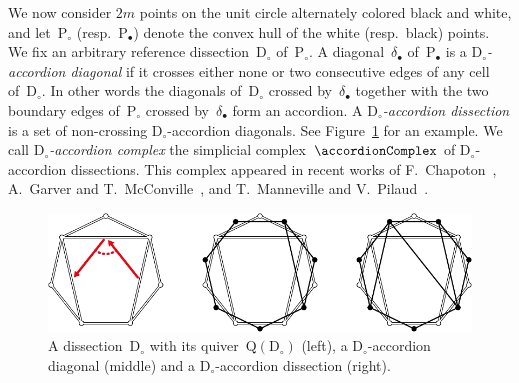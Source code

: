 \documentclass{amsart}
\theoremstyle{definition}
\newcommand{\fref}[1]{Figure~\ref{#1}} %
\newcommand{\darkblue}{\color{darkblue}} %
\newcommand{\defn}[1]{\textsl{\darkblue #1}} %
\newcommand{\polygon}{\mathrm{P}} %
\newcommand{\dissection}{\mathrm{D}} %
\newcommand{\sign}[3]{\varepsilon \big( {#1} \in {#2}\;|\;{#3} \big)} %
\newcommand{\SSS}{\reflectbox{$\mathsf{Z}$}} %
\newcommand{\ZZZ}{\mathsf{Z}} %
\newcommand{\VVV}{{\mathsf{{V \hspace{-.1686cm} I\,}}}} %
\newcommand{\quiver}{\mathrm{Q}} %
\begin{document}
We now consider $2m$ points on the unit circle alternately colored black and white, and let~$\polygon_\circ$ (resp.~$\polygon_\bullet$) denote the convex hull of the white (resp.~black) points.
We fix an arbitrary reference dissection~$\dissection_\circ$ of~$\polygon_\circ$.
A diagonal~$\delta_\bullet$ of~$\polygon_\bullet$ is a \defn{$\dissection_\circ$-accordion diagonal} if it crosses either none or two consecutive edges of any cell of~$\dissection_\circ$.
In other words the diagonals of~$\dissection_\circ$ crossed by~$\delta_\bullet$ together with the two boundary edges of~$\polygon_\circ$ crossed by~$\delta_\bullet$ form an accordion.
A \defn{$\dissection_\circ$-accordion dissection} is a set of non-crossing \mbox{$\dissection_\circ$-accordion} diagonals. 
See \fref{fig:exmAccordionDissections} for an example.
We call \defn{$\dissection_\circ$-accordion complex} the simplicial complex~$\accordionComplex$ of $\dissection_\circ$-accordion dissections.
This complex appeared in recent works of F.~Chapoton~\cite{Chapoton}, A.~Garver and T.~McConville~\cite{GarverMcConville}, and T.~Manneville and V.~Pilaud~\cite{MannevillePilaud}.

\begin{figure}
	\capstart
	\centerline{\includegraphics[width=\textwidth]{exmAccordionDissections}}
	\caption{A dissection~$\dissection_\circ$ with its quiver~$\quiver(\dissection_\circ)$ (left), a $\dissection_\circ$-accordion diagonal (middle) and a $\dissection_\circ$-accordion dissection (right).}
	\label{fig:exmAccordionDissections}
\end{figure}

\end{document}

